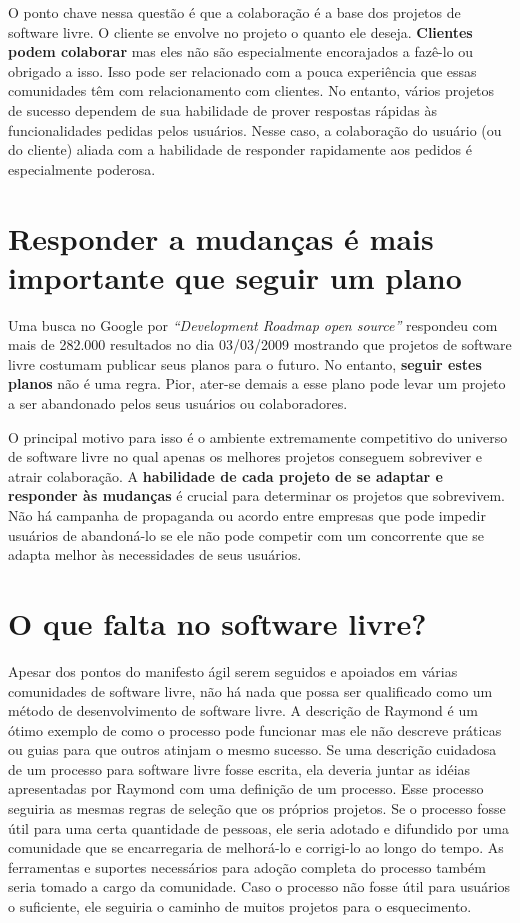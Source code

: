 O ponto chave nessa questão é que a colaboração é a base dos projetos
de software livre.  O cliente se envolve no projeto o quanto ele
deseja. \textbf{Clientes podem colaborar} mas eles não são
especialmente encorajados a fazê-lo ou obrigado a isso. Isso pode ser
relacionado com a pouca experiência que essas comunidades têm com
relacionamento com clientes. No entanto, vários projetos de sucesso
dependem de sua habilidade de prover respostas rápidas às
funcionalidades pedidas pelos usuários. Nesse caso, a colaboração do
usuário (ou do cliente) aliada com a habilidade de responder
rapidamente aos pedidos é especialmente poderosa.

\section{Responder a mudanças é mais importante que seguir um plano}
\label{sec:fourth-princ}

Uma busca no Google por \emph{``Development Roadmap open source''}
respondeu com mais de 282.000 resultados no dia 03/03/2009 mostrando
que projetos de software livre costumam publicar seus planos para o
futuro. No entanto, \textbf{seguir estes planos} não é uma
regra. Pior, ater-se demais a esse plano pode levar um projeto a ser
abandonado pelos seus usuários ou colaboradores.

O principal motivo para isso é o ambiente extremamente competitivo do
universo de software livre no qual apenas os melhores projetos
conseguem sobreviver e atrair colaboração. A \textbf{habilidade de
  cada projeto de se adaptar e responder às mudanças} é crucial para
determinar os projetos que sobrevivem. Não há campanha de propaganda
ou acordo entre empresas que pode impedir usuários de abandoná-lo se
ele não pode competir com um concorrente que se adapta melhor às
necessidades de seus usuários.

\section{O que falta no software livre?} %
\label{sec:os-summary}

Apesar dos pontos do manifesto ágil serem seguidos e apoiados em
várias comunidades de software livre, não há nada que possa ser
qualificado como um método de desenvolvimento de software livre. A
descrição de Raymond \cite{Raymond1999} é um ótimo exemplo de como o
processo pode funcionar mas ele não descreve práticas ou guias para
que outros atinjam o mesmo sucesso. Se uma descrição cuidadosa de um
processo para software livre fosse escrita, ela deveria juntar as
idéias apresentadas por Raymond com uma definição de um processo. Esse
processo seguiria as mesmas regras de seleção que os próprios
projetos. Se o processo fosse útil para uma certa quantidade de
pessoas, ele seria adotado e difundido por uma comunidade que se
encarregaria de melhorá-lo e corrigi-lo ao longo do tempo. As
ferramentas e suportes necessários para adoção completa do processo
também seria tomado a cargo da comunidade. Caso o processo não fosse
útil para usuários o suficiente, ele seguiria o caminho de muitos
projetos para o esquecimento.

